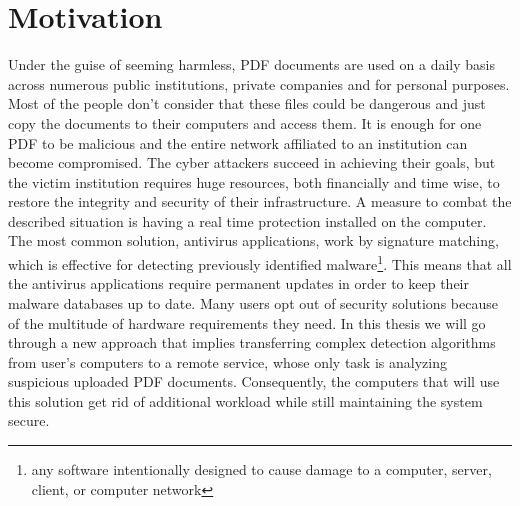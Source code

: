 \section{Motivation}
\label{section:motivation}
Under the guise of seeming harmless, PDF documents are used on a daily basis across numerous public institutions, private companies and for personal purposes. Most of the people don't consider that these files could be dangerous and just copy the documents to their computers and access them. It is enough for one PDF to be malicious and the entire network affiliated to an institution can become compromised. The cyber attackers succeed in achieving their goals, but the victim institution requires huge resources, both financially and time wise, to restore the integrity and security of their infrastructure. A measure to combat the described situation is having a real time protection installed on the computer. The most common solution, antivirus applications, work by signature matching, which is effective for detecting previously identified malware\footnote{any software intentionally designed to cause damage to a computer, server, client, or computer network}. This means that all the antivirus applications require permanent updates in order to keep their malware databases up to date. Many users opt out of security solutions because of the multitude of hardware requirements they need. In this thesis we will go through a new approach that implies transferring complex detection algorithms from user's computers to a remote service, whose only task is analyzing suspicious uploaded PDF documents. Consequently, the computers that will use this solution get rid of additional workload while still maintaining the system secure.


